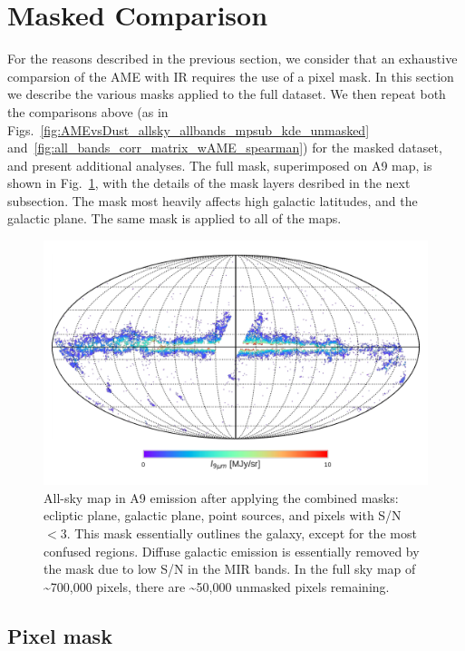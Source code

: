       \section{Masked Comparison}
        For the reasons described in the previous section, we consider that an exhaustive comparsion of the AME with IR requires the use of a pixel mask. In this section we describe the various masks applied to the full dataset. We then repeat both the comparisons above (as in  Figs.~\ref{fig:AMEvsDust_allsky_allbands_mpsub_kde_unmasked} and~\ref{fig:all_bands_corr_matrix_wAME_spearman}) for the masked dataset, and present additional analyses. The full mask, superimposed on A9 map, is shown in Fig.~\ref{fig:A9_masked_map}, with the details of the mask layers desribed in the next subsection. The mask most heavily affects high galactic latitudes, and the galactic plane. The same mask is applied to all of the maps.
          \begin{figure}
            \includegraphics[width=\textwidth]{../Plots/ch_allsky/masked_map_A9.pdf}
            \centering
            \caption{All-sky map in A9 emission after applying the combined masks: ecliptic plane, galactic plane, point sources, and pixels with S/N $<3$. This mask essentially outlines the galaxy, except for the most confused regions. Diffuse galactic emission is essentially removed by the mask due to low S/N in the MIR bands. In the full sky map of \textasciitilde{}700,000 pixels, there are \textasciitilde{}50,000 unmasked pixels remaining.}
            \label{fig:A9_masked_map}
          \end{figure}

      \subsection{Pixel mask}
      \label{sec:pixmask}
